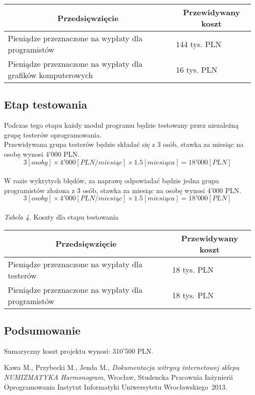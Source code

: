 \documentclass [11pt, a4paper, leqno]	{article}	%
\begin{document}
\begin{center}
	\begin{tabular}{| l | l |}
		\hline
		\multicolumn{1}{|c|}{Przedsięwzięcie} & 
		\multicolumn{1}{|c|}{Przewidywany koszt} \\ \hline \hline
		Pieniądze przeznaczone na wypłaty dla programistów & 144 tys. PLN \\ \hline
		Pieniądze przeznaczone na wypłaty dla grafików komputerowych & 16 tys. PLN \\ \hline
	\end{tabular}
\end{center}

\subsection{Etap testowania}
\noindent
Podczas tego etapu każdy moduł programu będzie testowany przez niezależną grupę testerów oprogramowania. \\
Przewidywana grupa testerów będzie składać się z 3 osób, stawka za miesiąc na osobę wynosi 4’000 PLN. \\
\begin{equation}3 [osoby] \times 4'000 [PLN/miesiąc] \times 1.5 [miesiąca] = 18'000 [PLN] \end{equation} \\
W razie wykrytych błędów, za naprawę odpowiadać będzie jedna grupa programistów złożona z 3 osób, stawka za miesiąc na osobę wynosi 4’000 PLN. \\
\begin{equation}3 [osoby] \times 4'000 [PLN/miesiąc] \times 1.5 [miesiąca] = 18'000 [PLN] \end{equation} \\
\textit{Tabela 4.} Koszty dla etapu testowania

\begin{center}
	\begin{tabular}{| l | l |}
		\hline
		\multicolumn{1}{|c|}{Przedsięwzięcie} & 
		\multicolumn{1}{|c|}{Przewidywany koszt} \\ \hline \hline
		Pieniądze przeznaczone na wypłaty dla testerów & 18 tys. PLN \\ \hline
		Pieniądze przeznaczone na wypłaty dla programistów & 18 tys. PLN \\ \hline
	\end{tabular}
\end{center}

\subsection{Podsumowanie}
\noindent
Sumaryczny koszt projektu wynosi: 310'500 PLN. \\

\begin{thebibliography}{2}
	 Kawa M., Przybecki M., Jenda M., \emph{Dokumentacja witryny internetowej sklepu NUMIZMATYKA Harmonogram}, Wrocław, Studencka Pracownia Inżynierii Oprogramowania Instytut Informatyki Uniwersytetu Wrocławskiego~2013.
\end{thebibliography}
\end{document}
